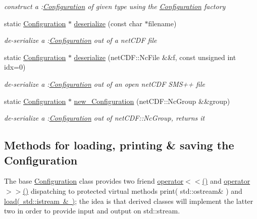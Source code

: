 \begin{DoxyCompactItemize}
\begin{DoxyCompactList}\small\item\em construct a \+:\mbox{\hyperlink{class_s_m_spp__di__unipi__it_1_1_configuration}{Configuration}} of given type using the \mbox{\hyperlink{class_s_m_spp__di__unipi__it_1_1_configuration}{Configuration}} factory \end{DoxyCompactList}\item 
static \mbox{\hyperlink{class_s_m_spp__di__unipi__it_1_1_configuration}{Configuration}} $\ast$ \mbox{\hyperlink{class_s_m_spp__di__unipi__it_1_1_configuration_a80f801b1a2fd7ab7648faaa9004f06c9}{deserialize}} (const char $\ast$filename)
\begin{DoxyCompactList}\small\item\em de-\/serialize a \+:\mbox{\hyperlink{class_s_m_spp__di__unipi__it_1_1_configuration}{Configuration}} out of a net\+C\+DF file \end{DoxyCompactList}\item 
static \mbox{\hyperlink{class_s_m_spp__di__unipi__it_1_1_configuration}{Configuration}} $\ast$ \mbox{\hyperlink{class_s_m_spp__di__unipi__it_1_1_configuration_aa50ffc4fbed5f8c1889daffea9fce821}{deserialize}} (net\+C\+D\+F\+::\+Nc\+File \&\&f, const unsigned int idx=0)
\begin{DoxyCompactList}\small\item\em de-\/serialize a \+:\mbox{\hyperlink{class_s_m_spp__di__unipi__it_1_1_configuration}{Configuration}} out of an open net\+C\+DF S\+M\+S++ file \end{DoxyCompactList}\item 
static \mbox{\hyperlink{class_s_m_spp__di__unipi__it_1_1_configuration}{Configuration}} $\ast$ \mbox{\hyperlink{class_s_m_spp__di__unipi__it_1_1_configuration_af3e786f9d33114595e17e3704a3b9a71}{new\+\_\+\+Configuration}} (net\+C\+D\+F\+::\+Nc\+Group \&\&group)
\begin{DoxyCompactList}\small\item\em de-\/serialize a \+:\mbox{\hyperlink{class_s_m_spp__di__unipi__it_1_1_configuration}{Configuration}} out of net\+C\+D\+F\+::\+Nc\+Group, returns it \end{DoxyCompactList}\end{DoxyCompactItemize}
\subsection*{Methods for loading, printing \& saving the Configuration}
\label{_amgrp36716fab9a043020028ffcf8a2abc7d8}%
The base \mbox{\hyperlink{class_s_m_spp__di__unipi__it_1_1_configuration}{Configuration}} class provides two friend \mbox{\hyperlink{class_s_m_spp__di__unipi__it_1_1_configuration_ad9926988904739fe7789505dc5292685}{operator$<$$<$()}} and \mbox{\hyperlink{class_s_m_spp__di__unipi__it_1_1_configuration_a670faf8496c014b1c605559fca07429b}{operator$>$$>$()}} dispatching to protected virtual methods print( std\+::ostream\& ) and \mbox{\hyperlink{class_s_m_spp__di__unipi__it_1_1_configuration_a27ae9e4279482d52342c7958c34a43c6}{load( std\+::istream \& )}}; the idea is that derived classes will implement the latter two in order to provide input and output on std\+::stream.

